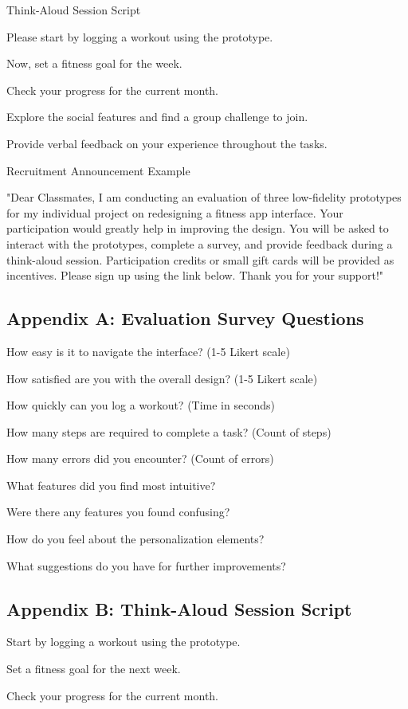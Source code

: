 \documentclass[
	letterpaper, %
]{jdf}
\begin{document}
Think-Aloud Session Script

Please start by logging a workout using the prototype.

Now, set a fitness goal for the week.

Check your progress for the current month.

Explore the social features and find a group challenge to join.

Provide verbal feedback on your experience throughout the tasks.

Recruitment Announcement Example

"Dear Classmates, I am conducting an evaluation of three low-fidelity prototypes for my individual project on redesigning a fitness app interface. Your participation would greatly help in improving the design. You will be asked to interact with the prototypes, complete a survey, and provide feedback during a think-aloud session. Participation credits or small gift cards will be provided as incentives. Please sign up using the link below. Thank you for your support!"

\subsection{Appendix A: Evaluation Survey Questions}
How easy is it to navigate the interface? (1-5 Likert scale)

How satisfied are you with the overall design? (1-5 Likert scale)

How quickly can you log a workout? (Time in seconds)

How many steps are required to complete a task? (Count of steps)

How many errors did you encounter? (Count of errors)

What features did you find most intuitive?

Were there any features you found confusing?

How do you feel about the personalization elements?

What suggestions do you have for further improvements?

\subsection{Appendix B: Think-Aloud Session Script}
Start by logging a workout using the prototype.

Set a fitness goal for the next week.

Check your progress for the current month.
\end{document}
